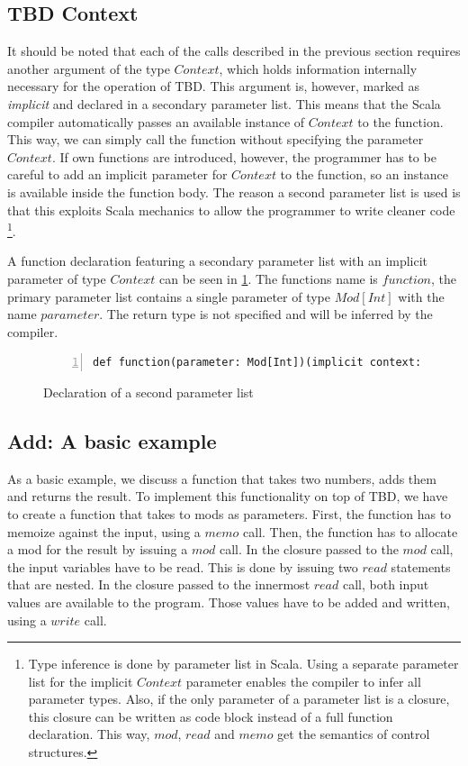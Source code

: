 \subsection{TBD Context} 

It should be noted that each of the calls described in the previous section requires another argument of the type $Context$, which holds information internally necessary for the operation of TBD. This argument is, however, marked as \textit{implicit} and declared in a secondary parameter list. This means that the Scala compiler automatically passes an available instance of $Context$ to the function. This way, we can simply call the function without specifying the parameter $Context$. If own functions are introduced, however, the programmer has to be careful to add an implicit parameter for $Context$ to the function, so an instance is available inside the function body. The reason a second parameter list is used is that this exploits Scala mechanics to allow the programmer to write cleaner code \footnote{Type inference is done by parameter list in Scala. Using a separate parameter list for the implicit $Context$ parameter enables the compiler to infer all parameter types. Also, if the only parameter of a parameter list is a closure, this closure can be written as code block instead of a full function declaration. This way, $mod$, $read$ and $memo$ get the semantics of control structures.}.

A function declaration featuring a secondary parameter list with an implicit parameter of type $Context$ can be seen in \ref{code:second_param}. The functions name is $function$, the primary parameter list contains a single parameter of type $Mod[Int]$ with the name $parameter$. The return type is not specified and will be inferred by the compiler. 

\begin{figure}
\begin{lstlisting}[frame=single,basicstyle=\ttfamily,numbers=left]
def function(parameter: Mod[Int])(implicit context: Context)
\end{lstlisting}
\caption{Declaration of a second parameter list}
\label{code:second_param}
\end{figure}

\subsection{Add: A basic example}
\label{sec:tbd_basic_example}
As a basic example, we discuss a function that takes two numbers, adds them and returns the result. To implement this functionality on top of TBD, we have to create a function that takes to mods as parameters. First, the function has to memoize against the input, using a $memo$ call. Then, the function has to allocate a mod for the result by issuing a $mod$ call. In the closure passed to the $mod$ call, the input variables have to be read. This is done by issuing two $read$ statements that are nested. In the closure passed to the innermost $read$ call, both input values are available to the program. Those values have to be added and written, using a $write$ call. 

